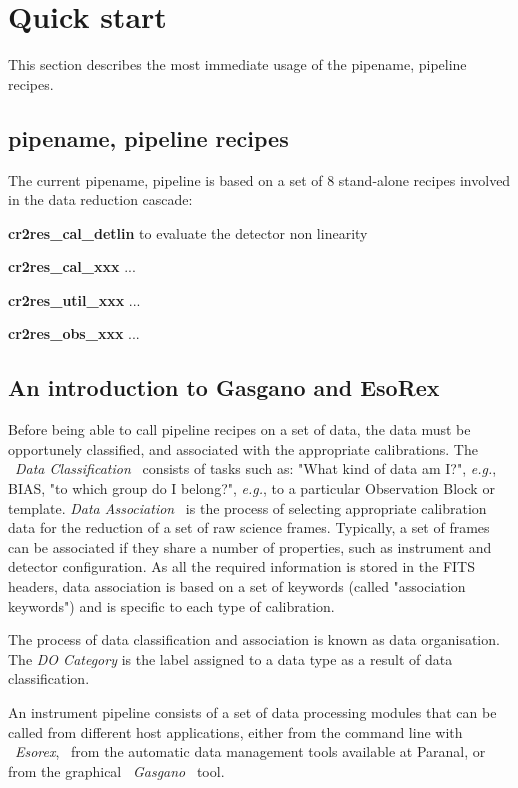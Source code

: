 
\section{\label{COOK}Quick start}

This section describes the most immediate usage of the pipename, pipeline 
recipes.


\subsection{pipename, pipeline recipes}
\label{RECIPES}
The current pipename, pipeline is based on a set of 8 stand-alone recipes 
involved in the data reduction cascade:

\begin{description}
\item {\bf cr2res\_cal\_detlin} to evaluate the detector non linearity 
\item {\bf cr2res\_cal\_xxx} ...
\item {\bf cr2res\_util\_xxx} ...
\item {\bf cr2res\_obs\_xxx} ...
\end{description}

\subsection{An introduction to Gasgano and EsoRex}
\label{LAUNCH}

Before being able to call pipeline recipes on a set of data, the data 
must be opportunely classified, and associated with the appropriate
calibrations. The \ {\it Data Classification} \ consists of tasks
such as: "What kind of
data am I?", {\it e.g.}, BIAS, "to which group do I belong?",
{\it e.g.}, to a particular Observation Block or template.
{\it Data Association} \ is the process of selecting appropriate
calibration
data for the reduction of a set of raw science frames. Typically, a set
of frames can be associated if they share a number of properties, such as
instrument and detector configuration. As all the required information is
stored in the FITS headers, data association is based on a set of
keywords (called "association keywords") and is specific to each type of
calibration.

The process of data classification and association is 
known as data organisation. The {\it DO Category} is the 
label assigned to a data type as a result of data classification.

An instrument pipeline consists of a set of data processing modules that
can be called from different host applications, either from the command
line with \ {\it Esorex}, \ from the automatic data management tools 
available at Paranal, or from the graphical \ {\it Gasgano} \ tool.

